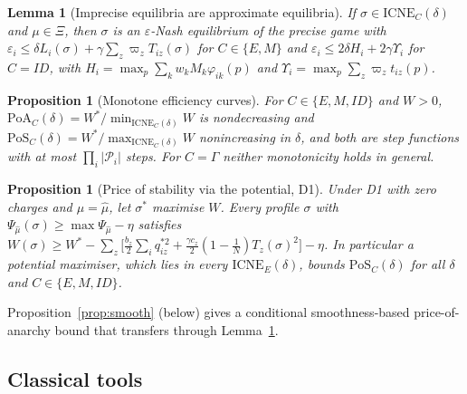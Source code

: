 \documentclass[preprint,11pt]{elsarticle}
\newtheorem{lemma}[theorem]{Lemma}
\newtheorem{proposition}[theorem]{Proposition}
\theoremstyle{definition}
\theoremstyle{remark}
\newcommand{\cP}{\mathcal{P}}
\newcommand{\ICNE}{\mathrm{ICNE}}
\begin{document}
\begin{lemma}[Imprecise equilibria are approximate equilibria]\label{lem:transfer}
If $\sigma\in\ICNE_C(\delta)$ and $\mu\in\Xi$, then $\sigma$ is an $\varepsilon$-Nash equilibrium of the precise game with $\varepsilon_i\le\delta L_i(\sigma)+\gamma\sum_z\varpi_zT_{iz}(\sigma)$ for $C\in\{E,M\}$ and $\varepsilon_i\le2\delta H_i+2\gamma\Upsilon_i$ for $C=ID$, with $H_i=\max_p\sum_kw_kM_k\varphi_{ik}(p)$ and $\Upsilon_i=\max_p\sum_z\varpi_zt_{iz}(p)$.
\end{lemma}

\begin{proposition}[Monotone efficiency curves]\label{prop:cs}
For $C\in\{E,M,ID\}$ and $W>0$, $\mathrm{PoA}_C(\delta)=W^*/\min_{\ICNE_C(\delta)}W$ is nondecreasing and $\mathrm{PoS}_C(\delta)=W^*/\max_{\ICNE_C(\delta)}W$ nonincreasing in $\delta$, and both are step functions with at most $\prod_i|\cP_i|$ steps. For $C=\Gamma$ neither monotonicity holds in general.
\end{proposition}

\begin{proposition}[Price of stability via the potential, D1]\label{prop:pos}
Under D1 with zero charges and $\mu=\hat\mu$, let $\sigma^*$ maximise $W$. Every profile $\sigma$ with $\Psi_{\hat\mu}(\sigma)\ge\max\Psi_{\hat\mu}-\eta$ satisfies
$W(\sigma)\ge W^*-\sum_z\big[\tfrac{b_z}{2}\sum_iq_{iz}^{*2}+\tfrac{\gamma c_z}{2}(1-\tfrac1N)T_z(\sigma)^2\big]-\eta$. In particular a potential maximiser, which lies in every $\ICNE_E(\delta)$, bounds $\mathrm{PoS}_C(\delta)$ for all $\delta$ and $C\in\{E,M,ID\}$.
\end{proposition}

Proposition~\ref{prop:smooth} (below) gives a conditional smoothness-based price-of-anarchy bound that transfers through Lemma~\ref{lem:transfer}.

\subsection{Classical tools}
\end{document}
